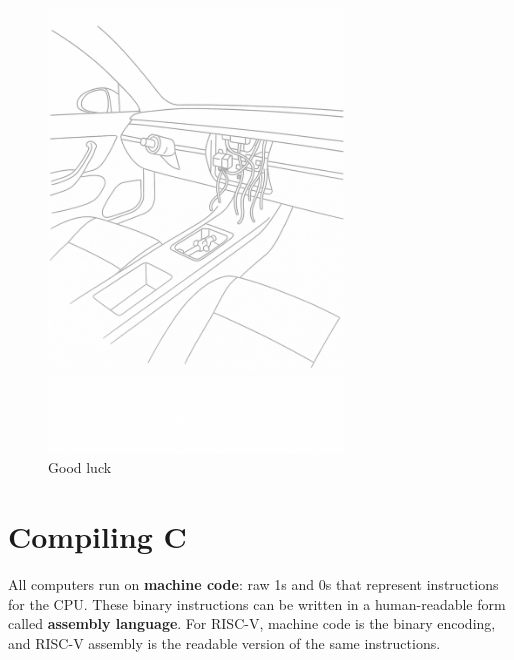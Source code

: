 \documentclass[12pt]{article}
\begin{document}
\begin{figure}[htbp]
    \centering
    \includegraphics[width=0.7\textwidth]{c.png}
    \caption{Good luck}
    \label{fig:c}
\end{figure}

\newpage

\section*{Compiling C}

All computers run on \textbf{machine code}: raw 1s and 0s that represent instructions for the CPU. These binary instructions can be written in a human-readable form called \textbf{assembly language}. For RISC-V, machine code is the binary encoding, and RISC-V assembly is the readable version of the same instructions.

\begin{center}
\end{center}
\end{document}

